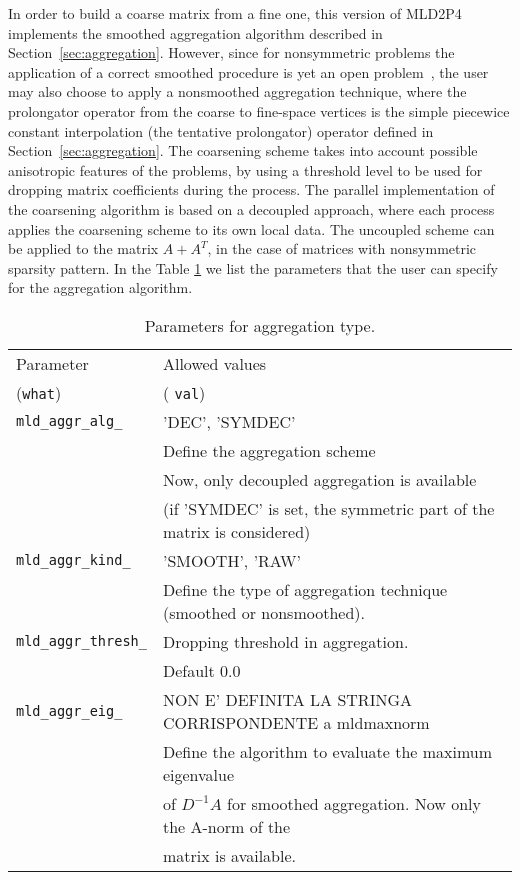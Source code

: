In order to build a coarse matrix from a fine one, this version of MLD2P4 implements the
smoothed aggregation algorithm described in Section~\ref{sec:aggregation}. However, since for nonsymmetric problems the
application of a correct smoothed procedure is yet an open problem~\cite{lin}, the user
may also choose to apply a nonsmoothed aggregation technique, where the prolongator operator from 
the coarse to fine-space vertices is the simple piecewice constant interpolation
(the tentative prolongator) operator defined in Section~\ref{sec:aggregation}. 
The coarsening scheme takes into account possible anisotropic features of the problems, by using
a threshold level to be used for dropping matrix coefficients during the process. 
The parallel implementation of the coarsening algorithm is based on a decoupled approach, where each process applies the coarsening scheme
to its own local data. The uncoupled scheme can be applied to the matrix $A+A^T$, in the case of matrices with nonsymmetric sparsity pattern.
In the Table \ref{tab:aggr_type} we list the parameters that the user can specify for the aggregation algorithm.
\begin{table}[h]
{\small \label{tab:aggr_type} 
\begin{tabular}{ll}
Parameter               & Allowed values \\
(\verb|what|)           & ( \verb|val|)\\
\verb|mld_aggr_alg_|    & 'DEC', 'SYMDEC'\\
                        & Define the aggregation scheme\\
                        & Now, only decoupled aggregation is available \\
                        & (if 'SYMDEC' is set, the symmetric part of the matrix is considered)\\
\verb|mld_aggr_kind_|   & 'SMOOTH', 'RAW'\\
                        & Define the type of aggregation technique (smoothed or nonsmoothed).\\
\verb|mld_aggr_thresh_| & Dropping threshold in aggregation.\\
                        & Default 0.0\\
\verb|mld_aggr_eig_|    & NON E' DEFINITA LA STRINGA CORRISPONDENTE a mldmaxnorm\\
                        & Define the algorithm to evaluate the maximum eigenvalue\\
                        & of $D^{-1}A$ for smoothed aggregation. Now only the A-norm of the\\
                        & matrix is available.\\
\end{tabular}
\caption{Parameters for aggregation type.}
}
\end{table}

